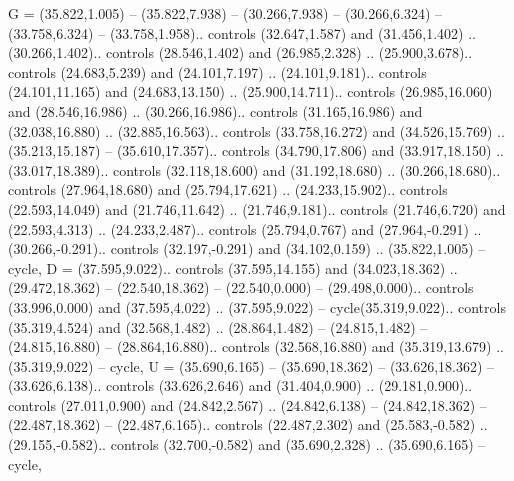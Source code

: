 {G} = {(35.822,1.005) -- (35.822,7.938) -- (30.266,7.938) -- (30.266,6.324) -- (33.758,6.324) -- (33.758,1.958).. controls (32.647,1.587) and (31.456,1.402) .. (30.266,1.402).. controls (28.546,1.402) and (26.985,2.328) .. (25.900,3.678).. controls (24.683,5.239) and (24.101,7.197) .. (24.101,9.181).. controls (24.101,11.165) and (24.683,13.150) .. (25.900,14.711).. controls (26.985,16.060) and (28.546,16.986) .. (30.266,16.986).. controls (31.165,16.986) and (32.038,16.880) .. (32.885,16.563).. controls (33.758,16.272) and (34.526,15.769) .. (35.213,15.187) -- (35.610,17.357).. controls (34.790,17.806) and (33.917,18.150) .. (33.017,18.389).. controls (32.118,18.600) and (31.192,18.680) .. (30.266,18.680).. controls (27.964,18.680) and (25.794,17.621) .. (24.233,15.902).. controls (22.593,14.049) and (21.746,11.642) .. (21.746,9.181).. controls (21.746,6.720) and (22.593,4.313) .. (24.233,2.487).. controls (25.794,0.767) and (27.964,-0.291) .. (30.266,-0.291).. controls (32.197,-0.291) and (34.102,0.159) .. (35.822,1.005) -- cycle},
{D} = {(37.595,9.022).. controls (37.595,14.155) and (34.023,18.362) .. (29.472,18.362) -- (22.540,18.362) -- (22.540,0.000) -- (29.498,0.000).. controls (33.996,0.000) and (37.595,4.022) .. (37.595,9.022) -- cycle(35.319,9.022).. controls (35.319,4.524) and (32.568,1.482) .. (28.864,1.482) -- (24.815,1.482) -- (24.815,16.880) -- (28.864,16.880).. controls (32.568,16.880) and (35.319,13.679) .. (35.319,9.022) -- cycle},
{U} = {(35.690,6.165) -- (35.690,18.362) -- (33.626,18.362) -- (33.626,6.138).. controls (33.626,2.646) and (31.404,0.900) .. (29.181,0.900).. controls (27.011,0.900) and (24.842,2.567) .. (24.842,6.138) -- (24.842,18.362) -- (22.487,18.362) -- (22.487,6.165).. controls (22.487,2.302) and (25.583,-0.582) .. (29.155,-0.582).. controls (32.700,-0.582) and (35.690,2.328) .. (35.690,6.165) -- cycle},
